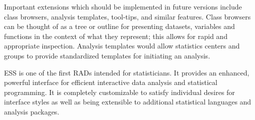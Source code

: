 \documentclass{article}
\begin{document}

Important extensions which should be implemented in future
versions include class browsers, analysis templates, tool-tips, and
similar features.  Class browsers can be thought of as a tree or
outline for presenting datasets, variables and functions in the
context of what they represent; this allows for rapid and appropriate
inspection.  Analysis templates would allow statistics centers and
groups to provide standardized templates for initiating an analysis.

ESS is one of the first RADs intended for statisticians.  It provides
an enhanced, powerful interface for efficient interactive data
analysis and statistical programming.  It is completely customizable
to satisfy individual desires for interface styles as well as being
extensible to additional statistical languages and analysis packages.




\end{document}
